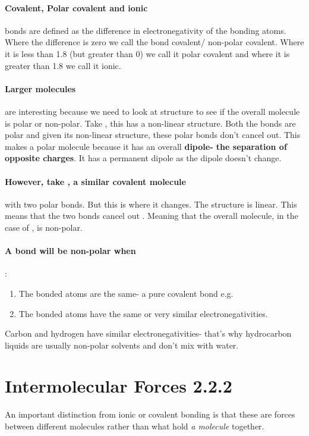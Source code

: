 	\paragraph{Covalent, Polar covalent and ionic} bonds are defined as the difference in electronegativity of the bonding atoms.
	Where the difference is zero we call the bond covalent/ non-polar covalent.
	Where it is less than 1.8 (but greater than 0) we call it polar covalent and where it is greater than 1.8 we call it ionic.
	
	\paragraph{Larger molecules} are interesting because we need to look at structure to see if the overall molecule is polar or non-polar.
	Take , this has a non-linear structure. Both the  bonds are polar and given its non-linear structure, these polar bonds don't cancel out.
	This makes  a polar molecule because it has an overall \textbf{dipole- the separation of opposite charges}. It has a permanent dipole as the dipole doesn't change.
	\paragraph{However, take , a similar covalent molecule} with two  polar bonds.
	But this is where it changes. The structure is linear.
	This means that the two bonds cancel out .
	Meaning that the overall molecule, in the case of , is non-polar.
    \paragraph{A bond will be non-polar when}: 
    \begin{enumerate}
\item The bonded atoms are the same- a pure covalent bond e.g. 
\item The bonded atoms have the same or very similar electronegativities. 
\end{enumerate}
Carbon and hydrogen have similar electronegativities- that's why hydrocarbon liquids are usually non-polar solvents and don't mix with water.

\section{Intermolecular Forces 2.2.2}
An important distinction from ionic or covalent bonding is that these are forces between different molecules rather than what hold\textit{ a molecule} together.

